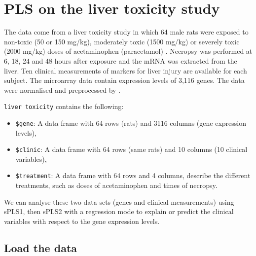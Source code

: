 \documentclass[
]{book}
\newenvironment{Shaded}{\begin{snugshade}}{\end{snugshade}}
\newcommand{\CommentTok}[1]{\textcolor[rgb]{0.56,0.35,0.01}{\textit{#1}}}
\newcommand{\FunctionTok}[1]{\textcolor[rgb]{0.00,0.00,0.00}{#1}}
\newcommand{\NormalTok}[1]{#1}
\newcommand{\OtherTok}[1]{\textcolor[rgb]{0.56,0.35,0.01}{#1}}
\newcommand{\SpecialCharTok}[1]{\textcolor[rgb]{0.00,0.00,0.00}{#1}}
\newcommand{\StringTok}[1]{\textcolor[rgb]{0.31,0.60,0.02}{#1}}
\providecommand{\tightlist}{%
  \setlength{\itemsep}{0pt}\setlength{\parskip}{0pt}}
\begin{document}
\hypertarget{04}{%
\chapter{PLS on the liver toxicity study}\label{04}}

The data come from a liver toxicity study in which 64 male rats were exposed to non-toxic (50 or 150 mg/kg), moderately toxic (1500 mg/kg) or severely toxic (2000 mg/kg) doses of acetaminophen (paracetamol) \citep{Bus07}. Necropsy was performed at 6, 18, 24 and 48 hours after exposure and the mRNA was extracted from the liver. Ten clinical measurements of markers for liver injury are available for each subject. The microarray data contain expression levels of 3,116 genes. The data were normalised and preprocessed by \citet{Bus07}.

\texttt{liver\ toxicity} contains the following:

\begin{itemize}
\tightlist
\item
  \texttt{\$gene}: A data frame with 64 rows (rats) and 3116 columns (gene expression levels),
\item
  \texttt{\$clinic}: A data frame with 64 rows (same rats) and 10 columns (10 clinical variables),
\item
  \texttt{\$treatment}: A data frame with 64 rows and 4 columns, describe the different treatments, such as doses of acetaminophen and times of necropsy.
\end{itemize}

We can analyse these two data sets (genes and clinical measurements) using sPLS1, then sPLS2 with a regression mode to explain or predict the clinical variables with respect to the gene expression levels.

\hypertarget{04:load-data}{%
\section{Load the data}\label{04:load-data}}

\begin{Shaded}
\end{Shaded}
\end{document}
